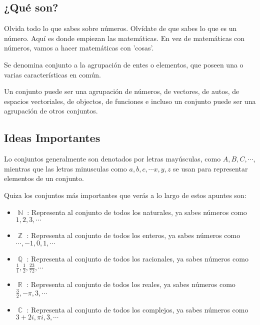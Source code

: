 \documentclass[12pt]{report}                                    %
\DeclareMathOperator \Naturals {\mathbb{N}}                     %
\DeclareMathOperator \Integers {\mathbb{Z}}                     %
\DeclareMathOperator \Racionals{\mathbb{Q}}                     %
\DeclareMathOperator \Reals {\mathbb{R}}                        %
\DeclareMathOperator \Complexs {\mathbb{C}}                     %
\begin{document}
        \subsection*{¿Qué son?}
            Olvida todo lo que sabes sobre números. Olvídate de que sabes lo que es un número.
            Aquí es donde empiezan las matemáticas. En vez de matemáticas con números,
            vamos a hacer matemáticas con 'cosas'.

            Se denomina conjunto a la agrupación de entes o elementos, que poseen una o
            varias características en común. 

            Un conjunto puede ser una agrupación de números, de vectores, de autos, de espacios vectoriales,
            de objectos, de funciones e incluso un conjunto puede ser una agrupación de otros conjuntos.


            \subsection*{Ideas Importantes}

            Lo conjuntos generalmente son denotados por letras mayúsculas, como $A, B, C, \cdots$, mientras
            que las letras minusculas como $a, b, c, \cdots x, y, z$ se usan para representar elementos
            de un conjunto.


            Quiza los conjuntos más importantes que verás a lo largo de estos apuntes son:

            \begin{itemize}
                \item $\Naturals$ : Representa al conjunto de todos los naturales, ya sabes
                        números como \\$1, 2, 3, \cdots$
                \item $\Integers$ : Representa al conjunto de todos los enteros, ya sabes
                        números como \\$\cdots, -1, 0, 1, \cdots$
                \item $\Racionals$ : Representa al conjunto de todos los racionales, ya sabes
                        números como \\$\frac{1}{1}, \frac{1}{2}, \frac{23}{72}, \cdots$
                \item $\Reals$ : Representa al conjunto de todos los reales, ya sabes
                        números como \\$\frac{3}{2}, -\pi, 3, \cdots$
                \item $\Complexs$ : Representa al conjunto de todos los complejos, ya sabes
                        números como \\$3 + 2i, \pi i, 3, \cdots$
            \end{itemize}
\end{document}
